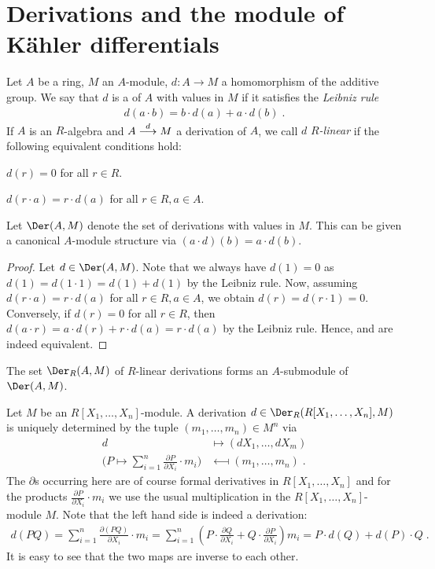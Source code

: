 \documentclass[a4paper,parskip=half,numbers=enddot, DIV=12, headheight=30pt]{scrreprt}
\begin{document}
\section{Derivations and the module of Kähler differentials}
\begin{defi}[Derivations]
    Let $A$ be a ring, $M$ an $A$-module, $d\colon A\to M$  a homomorphism of the additive group. We say that $d$ is a  of $A$ with values in $M$ if it satisfies the \emph{Leibniz rule} 
    \begin{align*}
    	 d(a\cdot b) = b\cdot d(a) + a\cdot d(b)\;.
    \end{align*}
     If $A$ is an $R$-algebra and $A\morphism[d] M$ a derivation of $A$, we call $d$ \emph{$R$-linear} if the following equivalent conditions hold:
    \begin{alphanumerate}
        \item 
            $d(r) = 0$ for all $r\in R$.
        \item
            $d(r\cdot a) = r\cdot d(a)$ for all $r\in R, a\in A$.
    \end{alphanumerate}
    Let $\Der(A,M)$ denote the set of derivations with values in $M$. This can be given a canonical $A$-module structure via $(a\cdot d)(b) = a\cdot d(b)$.
\end{defi}
\begin{proof}
    Let $d\in \Der(A,M)$. Note that we always have $d(1)=0$ as $d(1)=d(1\cdot1)=d(1)+d(1)$ by the Leibniz rule. Now, assuming $d(r\cdot a)=r\cdot d(a)$ for all $r\in R, a\in A$, we obtain $d(r)=d(r\cdot1)=0$. Conversely, if $d(r)=0$ for all $r\in R$, then $d(a\cdot r) = a\cdot d(r) + r\cdot d(a) = r\cdot d(a)$ by the Leibniz rule. Hence,  and  are indeed equivalent.
\end{proof}
\begin{rem}
    The set $\Der_R(A,M)$ of $R$-linear derivations forms an $A$-submodule of $\Der(A,M)$.
\end{rem}
\begin{example}
    Let $M$ be an $R[X_1,\ldots,X_n]$-module. A derivation $d\in\Der_R(R[X_1,\ldots,X_n], M)$ is uniquely determined by the tuple $(m_1,\ldots,m_n)\in M^n$ via
    \begin{align*}
        d&\longmapsto (dX_1,\ldots,dX_m)\\
        \bigg(P\mapsto \sum_{i=1}^n\frac{\partial P}{\partial X_i}\cdot m_i \bigg) &\longmapsfrom (m_1,\ldots,m_n)\;.
    \end{align*}
    The $\partial$s occurring here are of course formal derivatives in $R[X_1,\ldots,X_n]$ and for the products $\frac{\partial P}{\partial X_i}\cdot m_i$ we use the usual multiplication in the $R[X_1,\ldots,X_n]$-module $M$. Note that the left hand side is indeed a derivation:
    \begin{align*}
        d(PQ) = \sum_{i=1}^n \frac{\partial(PQ)}{\partial X_i} \cdot m_i = \sum_{i=1}^n \left( P \cdot\frac{\partial Q}{\partial X_i} + Q\cdot\frac{\partial P}{\partial X_i} \right) m_i = P\cdot d(Q) + d(P)\cdot Q\;.
    \end{align*}
    It is easy to see that the two maps are inverse to each other.
\end{example}
\end{document}
